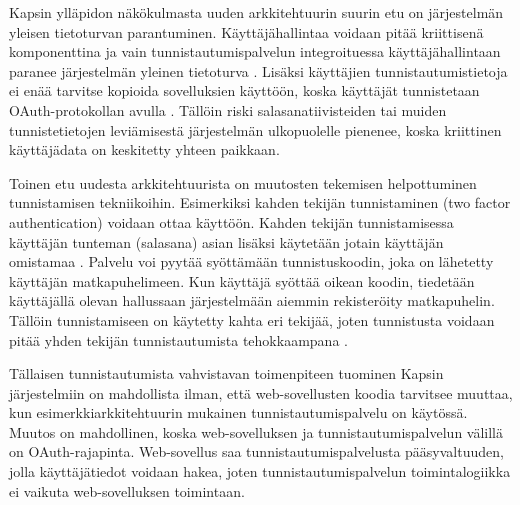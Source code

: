 Kapsin ylläpidon näkökulmasta uuden arkkitehtuurin suurin etu on järjestelmän yleisen tietoturvan parantuminen. Käyttäjähallintaa voidaan pitää kriittisenä komponenttina ja vain tunnistautumispalvelun integroituessa käyttäjähallintaan paranee järjestelmän yleinen tietoturva \cite{arkkitehtuurit}. Lisäksi käyttäjien tunnistautumistietoja ei enää tarvitse kopioida sovelluksien käyttöön, koska käyttäjät tunnistetaan OAuth-protokollan avulla \cite{oauth2_0}. Tällöin riski salasanatiivisteiden tai muiden tunnistetietojen leviämisestä järjestelmän ulkopuolelle pienenee, koska kriittinen käyttäjädata on keskitetty yhteen paikkaan.

Toinen etu uudesta arkkitehtuurista on muutosten tekemisen helpottuminen tunnistamisen tekniikoihin. Esimerkiksi kahden tekijän tunnistaminen (two factor authentication) voidaan ottaa käyttöön. Kahden tekijän tunnistamisessa käyttäjän tunteman (salasana) asian lisäksi käytetään jotain käyttäjän omistamaa \cite{nisti}. Palvelu voi pyytää syöttämään tunnistuskoodin, joka on lähetetty käyttäjän matkapuhelimeen. Kun käyttäjä syöttää oikean koodin, tiedetään käyttäjällä olevan hallussaan järjestelmään aiemmin rekisteröity matkapuhelin. Tällöin tunnistamiseen on käytetty kahta eri tekijää, joten tunnistusta voidaan pitää yhden tekijän tunnistautumista tehokkaampana \cite{nisti}.

Tällaisen tunnistautumista vahvistavan toimenpiteen tuominen Kapsin järjestelmiin on mahdollista ilman, että web-sovellusten koodia tarvitsee muuttaa, kun esimerkkiarkkitehtuurin mukainen tunnistautumispalvelu on käytössä. Muutos on mahdollinen, koska web-sovelluksen ja tunnistautumispalvelun välillä on OAuth-rajapinta. Web-sovellus saa tunnistautumispalvelusta pääsyvaltuuden, jolla käyttäjätiedot voidaan hakea, joten tunnistautumispalvelun toimintalogiikka ei vaikuta web-sovelluksen toimintaan.